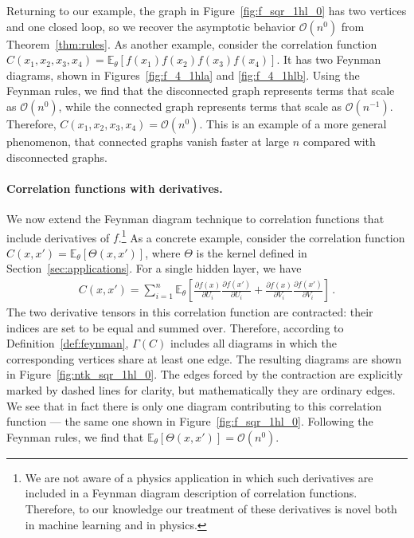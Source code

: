 \documentclass[english]{article}
\newcommand{\dho}{\partial}
\newcommand{\cO}{\ensuremath{\mathcal{O}}}
\newcommand{\lexpp}[1]{\mathbb{E}_{#1}\left[}
\newcommand{\rexp}{\right]}
\begin{document}
Returning to our example, the graph in Figure~\ref{fig:f_sqr_1hl_0} has two vertices and one closed loop, so we recover the asymptotic behavior $\cO(n^0)$ from Theorem~\ref{thm:rules}.
As another example, consider the correlation function $C(x_1,x_2,x_3,x_4) = \lexpp{\theta} f(x_1) f(x_2) f(x_3) f(x_4) \rexp$.
It has two Feynman diagrams, shown in Figures~\ref{fig:f_4_1hla} and \ref{fig:f_4_1hlb}.
Using the Feynman rules, we find that the disconnected graph represents terms that scale as $\cO(n^0)$, while the connected graph represents terms that scale as $\cO(n^{-1})$.
Therefore, $C(x_1,x_2,x_3,x_4) = \cO(n^0)$.
This is an example of a more general phenomenon, that connected graphs vanish faster at large $n$ compared with disconnected graphs.

\paragraph{Correlation functions with derivatives.}

We now extend the Feynman diagram technique to correlation functions that include derivatives of $f$.\footnote{We are not aware of a physics application in which such derivatives are included in a Feynman diagram description of correlation functions.
Therefore, to our knowledge our treatment of these derivatives is novel both in machine learning and in physics.}
As a concrete example, consider the correlation function $C(x,x') = \lexpp{\theta} \Theta(x,x') \rexp$, where $\Theta$ is the kernel defined in Section~\ref{sec:applications}.
For a single hidden layer, we have
\begin{align}
  C(x,x') 
  = \sum_{i=1}^n \lexpp{\theta} 
  \frac{\dho f(x)}{\dho U_i} \frac{\dho f(x')}{\dho U_i} + 
  \frac{\dho f(x)}{\dho V_i} \frac{\dho f(x')}{\dho V_i}
  \rexp \,.
\end{align}
The two derivative tensors in this correlation function are contracted: their indices are set to be equal and summed over.
Therefore, according to Definition~\ref{def:feynman}, $\Gamma(C)$ includes all diagrams in which the corresponding vertices share at least one edge.
The resulting diagrams are shown in Figure~\ref{fig:ntk_sqr_1hl_0}.
The edges forced by the contraction are explicitly marked by dashed lines for clarity, but mathematically they are ordinary edges.
We see that in fact there is only one diagram contributing to this correlation function --- the same one shown in Figure~\ref{fig:f_sqr_1hl_0}.
Following the Feynman rules, we find that $\lexpp{\theta} \Theta(x,x') \rexp = \cO(n^0)$.
\end{document}
